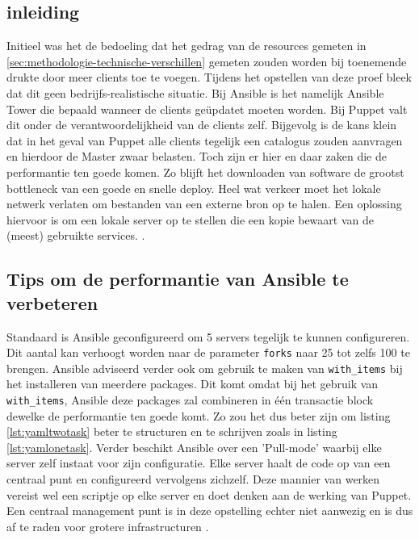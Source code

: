 \subsection{inleiding}
\label{sec:inleiding}
 Initieel was het de bedoeling dat het gedrag van de resources gemeten in \ref{sec:methodologie-technische-verschillen} gemeten zouden worden bij toenemende drukte door meer clients toe te voegen. Tijdens het opstellen van deze proef bleek dat dit geen bedrijfs-realistische situatie. Bij Ansible is het namelijk Ansible Tower die bepaald wanneer de clients ge\"updatet moeten worden. Bij Puppet valt dit onder de verantwoordelijkheid van de clients zelf. Bijgevolg is de kans klein dat in het geval van Puppet alle clients tegelijk een catalogus zouden aanvragen en hierdoor de Master zwaar belasten. Toch zijn er hier en daar zaken die de performantie ten goede komen. Zo blijft het downloaden van software de grootst bottleneck van een goede en snelle deploy. Heel wat verkeer moet het lokale netwerk verlaten om bestanden van een externe bron op te halen. Een oplossing hiervoor is om een lokale server op te stellen die een kopie bewaart van de (meest) gebruikte services. \autocite{AnsibleTuning}.
 
 \subsection{Tips om de performantie van Ansible te verbeteren}
 Standaard is Ansible geconfigureerd om 5 servers tegelijk te kunnen configureren. Dit aantal kan verhoogt worden naar de parameter \texttt{\gls{fork}s} naar 25 tot zelfs 100 te brengen. \newline
Ansible adviseerd verder ook om gebruik te maken van \texttt{with\_items} bij het installeren van meerdere packages. Dit komt omdat bij het gebruik van \texttt{with\_items}, Ansible deze packages zal combineren in \'e\'en transactie block dewelke de performantie ten goede komt. Zo zou het dus beter zijn om listing \ref{lst:yamltwotask} beter te structuren en te schrijven zoals in listing \ref{lst:yamlonetask}. \newline
Verder beschikt Ansible over een 'Pull-mode' waarbij elke server zelf instaat voor zijn configuratie. Elke server haalt de code op van een centraal punt en configureerd vervolgens zichzelf. Deze mannier van werken vereist wel een scriptje op elke server en doet denken aan de werking van Puppet. Een centraal management punt is in deze opstelling echter niet aanwezig en is dus af te raden voor grotere infrastructuren \autocite{AnsibleTuning} .


